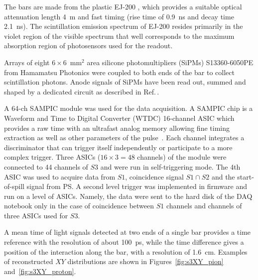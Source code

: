 The bars are made from the plastic EJ-200 \cite{SCIONIX}, which 
provides a suitable optical attenuation length 4~m and fast timing (rise time of 0.9~ns and decay time 2.1~ns). 
The scintillation emission spectrum of EJ-200 resides primarily in the violet region of the visible spectrum that well corresponds to the maximum absorption region of photosensors used for the readout.

Arrays of eight $6 \times 6$~mm$^2$ area silicone photomultipliers (SiPMs) S13360-6050PE from Hamamatsu Photonics \cite{Hamamatsu} were coupled to both ends of the bar to collect scintillation photons. Anode signals of SiPMs have been read out, summed and shaped by a dedicated circuit as described in Ref.\,\cite{S3-readout}.

A 64-ch SAMPIC  module was used for the data acquisition. A SAMPIC chip is a Waveform and Time to Digital Converter (WTDC) 16-channel ASIC which provides a raw time with an ultrafast analog memory allowing fine timing extraction as well as other parameters of the pulse~\cite{SAMPIC}. Each channel integrates a discriminator that can trigger itself independently or participate to a more complex trigger. 
Three ASICs ($16\times3=48$ channels) of the module were connected to 44 channels of $S3$ and were run in self-triggering mode. The 4th ASIC was used to acquire data from $S1$, coincidence signal $S1\cap S2$ and the start-of-spill signal from PS. A second level trigger was implemented in firmware and run on a level of ASICs. 
Namely, the data were sent to the hard disk of the DAQ notebook only in the case of coincidence between $S1$ channels and channels of three ASICs used for $S3$.


A mean time of light signals detected at two ends of a single bar provides a time reference with the resolution of about 100~ps, while the time difference gives a position of the interaction along the bar, with a resolution of 1.6~cm. Examples of reconstructed $XY$ distributions are shown in Figures~\ref{fig:s3XY_pion} and~\ref{fig:s3XY_proton}.



